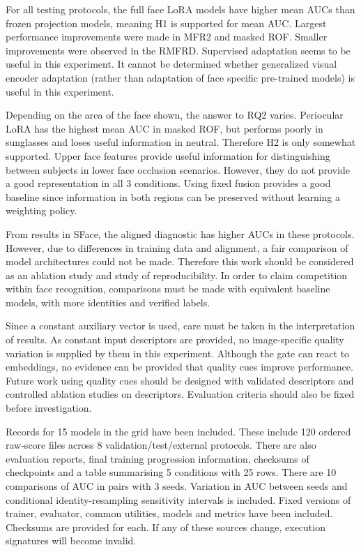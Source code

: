 For all testing protocols, the full face LoRA models have higher mean AUCs than frozen projection models, meaning H1 is supported for mean AUC. Largest performance improvements were made in MFR2 and masked ROF. Smaller improvements were observed in the RMFRD. Supervised adaptation seems to be useful in this experiment. It cannot be determined whether generalized visual encoder adaptation (rather than adaptation of face specific pre-trained models) is useful in this experiment.\par

Depending on the area of the face shown, the answer to RQ2 varies. Periocular LoRA has the highest mean AUC in masked ROF, but performs poorly in sunglasses and loses useful information in neutral. Therefore H2 is only somewhat supported. Upper face features provide useful information for distinguishing between subjects in lower face occlusion scenarios. However, they do not provide a good representation in all 3 conditions. Using fixed fusion provides a good baseline since information in both regions can be preserved without learning a weighting policy.\par

From results in SFace, the aligned diagnostic has higher AUCs in these protocols. However, due to differences in training data and alignment, a fair comparison of model architectures could not be made. Therefore this work should be considered as an ablation study and study of reproducibility. In order to claim competition within face recognition, comparisons must be made with equivalent baseline models, with more identities and verified labels.\par

Since a constant auxiliary vector is used, care must be taken in the interpretation of results. As constant input descriptors are provided, no image-specific quality variation is supplied by them in this experiment. Although the gate can react to embeddings, no evidence can be provided that quality cues improve performance. Future work using quality cues should be designed with validated descriptors and controlled ablation studies on descriptors. Evaluation criteria should also be fixed before investigation.\par

Records for 15 models in the grid have been included. These include 120 ordered raw-score files across 8 validation/test/external protocols. There are also evaluation reports, final training progression information, checksums of checkpoints and a table summarising 5 conditions with 25 rows. There are 10 comparisons of AUC in pairs with 3 seeds. Variation in AUC between seeds and conditional identity-resampling sensitivity intervals is included. Fixed versions of trainer, evaluator, common utilities, models and metrics have been included. Checksums are provided for each. If any of these sources change, execution signatures will become invalid.\par


